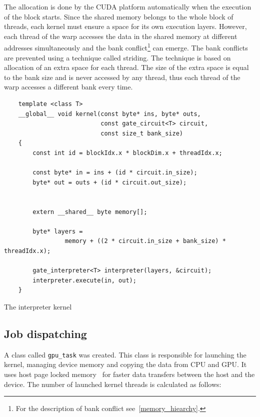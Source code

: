 \documentclass[12pt,oneside]{fithesis2}
\begin{document}
The allocation is done by the CUDA platform automatically when the execution of the block starts. Since the shared memory belongs to the whole block of threads, each kernel must ensure a space for its own execution layers. However, each thread of the warp accesses the data in the shared memory at different addresses simultaneously and the bank conflict\footnote{For the description of bank conflict see~\ref{memory_hiearchy}.} can emerge. The bank conflicts are prevented using a technique called striding. The technique is based on allocation of an extra space for each thread. The size of the extra space is equal to the bank size and is never accessed by any thread, thus each thread of the warp accesses a different bank every time.

\begin{listing}[h]
	\begin{verbatim}	
	template <class T>
	__global__ void kernel(const byte* ins, byte* outs,
	                       const gate_circuit<T> circuit,
	                       const size_t bank_size)
	{
		const int id = blockIdx.x * blockDim.x + threadIdx.x;
		
		const byte* in = ins + (id * circuit.in_size);
		byte* out = outs + (id * circuit.out_size);
		
		
		extern __shared__ byte memory[];
		
		byte* layers =
		         memory + ((2 * circuit.in_size + bank_size) * threadIdx.x);
		
		gate_interpreter<T> interpreter(layers, &circuit);
		interpreter.execute(in, out);
	}
	\end{verbatim}
	\caption{The interpreter kernel}
	\label{listing:kernel}
\end{listing}

\subsection{Job dispatching}

A class called \texttt{gpu\_task} was created. This class is responsible for launching the kernel, managing device memory and copying the data from CPU and GPU. It uses host page locked memory~\cite{cuda_guide} for faster data transfers between the host and the device. The number of launched kernel threads is calculated as follows:

\end{document}
